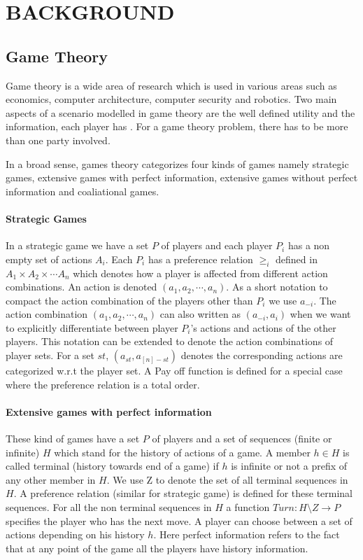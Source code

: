 \section{BACKGROUND}
\subsection{Game Theory}
\label{subsec: game_theory}
Game theory is a wide area of research which is used in various areas such as economics, computer architecture,  computer security and robotics. Two main aspects of a scenario modelled in game theory are the well defined utility and the information, each player has \cite{OR94}. For a game theory problem, there has to be more than one party involved. 
\par In a broad sense, games theory categorizes four kinds of games namely strategic games, extensive games with perfect information, extensive games without perfect information and coaliational games.

\paragraph{Strategic Games}\cite{OR94}
In a strategic game we have a set $P$ of players and each player $P_i$ has a non empty set of actions $A_i$. Each $P_i$ has a preference relation $\geq_i$ defined in $A_1 \times A_2 \times \cdots A_n$ which denotes how a player is affected from different action combinations. An action is denoted $(a_1,a_2, \cdots , a_n)$. As a short notation to compact the action combination of the players other than $P_i$ we use $a_{-i}$. The action combination $(a_1,a_2, \cdots , a_n)$ can also written as $(a_{-i},a_i)$ when we want to explicitly differentiate between player $P_i$'s actions and actions of the other players. This notation can be extended to denote the action combinations of player sets. For a set $st$, $(a_{st},a_{[n]-st})$
denotes the corresponding actions are categorized w.r.t the player set. 
\newline A Pay off function is defined for a special case where the preference relation is a total order. 
\paragraph{Extensive games with perfect information}\cite{OR94}
These kind of games have a set $P$ of players and a set of sequences (finite or infinite) $H$ which stand for the history of actions of a game. A member $h \in H$ is called terminal (history towards end of a game) if $h$ is infinite or not a prefix of any other member in $H$. We use Z to denote the set of all terminal sequences in $H$. A preference relation (similar for strategic game) is defined for these terminal sequences. For all the non terminal sequences in $H$ a function $Turn: H \setminus Z \rightarrow P $  specifies the player who has the next move. A player can choose between a set of actions depending on his history $h$. Here perfect information refers to the fact that at any point of the game all the players have history information.

